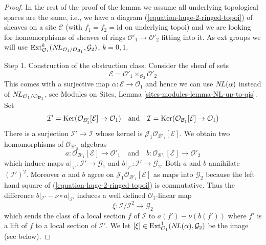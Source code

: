 \begin{proof}
\medskip\noindent
In the rest of the proof of the lemma we assume
all underlying topological spaces are the
same, i.e., we have a diagram (\ref{equation-huge-2-ringed-topoi})
of sheaves on a site $\mathcal{C}$ (with $f_1 = f_2 = \text{id}$
on underlying topoi) and we are looking for
homomorphisms of sheaves of rings
$\mathcal{O}'_1 \to \mathcal{O}'_2$ fitting into it.
As ext groups we will use
$\mathop{\mathrm{Ext}}\nolimits^k_{\mathcal{O}_1}(
\mathop{N\!L}\nolimits_{\mathcal{O}_1/\mathcal{O}_{\mathcal{B}_1}}, \mathcal{G}_2)$, $k = 0, 1$.

\medskip\noindent
Step 1. Construction of the obstruction class. Consider the sheaf
of sets
$$
\mathcal{E} = \mathcal{O}'_1 \times_{\mathcal{O}_2} \mathcal{O}'_2
$$
This comes with a surjective map $\alpha : \mathcal{E} \to \mathcal{O}_1$
and hence we can use $\mathop{N\!L}\nolimits(\alpha)$ instead of
$\mathop{N\!L}\nolimits_{\mathcal{O}_1/\mathcal{O}_{\mathcal{B}_1}}$, see
Modules on Sites, Lemma \ref{sites-modules-lemma-NL-up-to-qis}.
Set
$$
\mathcal{I}' =
\mathop{\mathrm{Ker}}(\mathcal{O}_{\mathcal{B}'_1}[\mathcal{E}] \to \mathcal{O}_1)
\quad\text{and}\quad
\mathcal{I} =
\mathop{\mathrm{Ker}}(\mathcal{O}_{\mathcal{B}_1}[\mathcal{E}] \to \mathcal{O}_1)
$$
There is a surjection $\mathcal{I}' \to \mathcal{I}$ whose kernel
is $\mathcal{J}_1\mathcal{O}_{\mathcal{B}'_1}[\mathcal{E}]$.
We obtain two homomorphisms of $\mathcal{O}_{\mathcal{B}'_2}$-algebras
$$
a : \mathcal{O}_{\mathcal{B}'_1}[\mathcal{E}] \to \mathcal{O}'_1
\quad\text{and}\quad
b : \mathcal{O}_{\mathcal{B}'_1}[\mathcal{E}] \to \mathcal{O}'_2
$$
which induce maps $a|_{\mathcal{I}'} : \mathcal{I}' \to \mathcal{G}_1$ and
$b|_{\mathcal{I}'} : \mathcal{I}' \to \mathcal{G}_2$. Both $a$ and $b$
annihilate $(\mathcal{I}')^2$. Moreover $a$ and $b$ agree on
$\mathcal{J}_1\mathcal{O}_{\mathcal{B}'_1}[\mathcal{E}]$
as maps into $\mathcal{G}_2$
because the left hand square of (\ref{equation-huge-2-ringed-topoi})
is commutative. Thus the difference
$b|_{\mathcal{I}'} - \nu \circ a|_{\mathcal{I}'}$
induces a well defined $\mathcal{O}_1$-linear map
$$
\xi : \mathcal{I}/\mathcal{I}^2 \longrightarrow \mathcal{G}_2
$$
which sends the class of a local section $f$ of $\mathcal{I}$ to
$a(f') - \nu(b(f'))$ where $f'$ is a lift of $f$ to a local
section of $\mathcal{I}'$. We let
$[\xi] \in \mathop{\mathrm{Ext}}\nolimits^1_{\mathcal{O}_1}(\mathop{N\!L}\nolimits(\alpha), \mathcal{G}_2)$
be the image (see below).


\end{proof}

